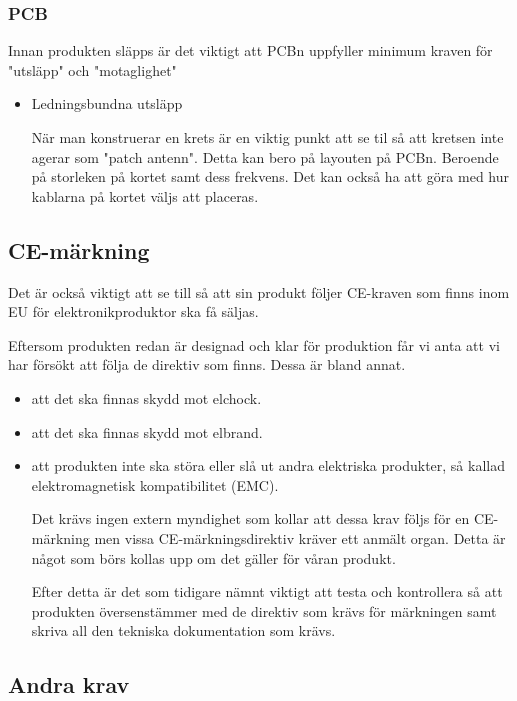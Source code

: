 \documentclass{article}
\begin{document}
\subsubsection{PCB}
Innan produkten släpps är det viktigt att PCBn uppfyller minimum kraven för "utsläpp" och "motaglighet"
\begin{itemize}
    
    \item Ledningsbundna utsläpp

        När man konstruerar en krets är en viktig punkt att se til så att kretsen inte agerar som "patch antenn". Detta kan bero på layouten på PCBn. Beroende på storleken på kortet samt dess frekvens. Det kan också ha att göra med hur kablarna på kortet väljs att placeras. \cite{Williams2011-dz}
    
\end{itemize}

\subsection{CE-märkning}
Det är också viktigt att se till så att sin produkt följer CE-kraven som finns inom EU för elektronikproduktor ska få säljas.

Eftersom produkten redan är designad och klar för produktion får vi anta att vi har försökt att följa de direktiv som finns. Dessa är bland annat.
\begin{itemize}
    \item att det ska finnas skydd mot elchock.
    \item att det ska finnas skydd mot elbrand.
    \item att produkten inte ska störa eller slå ut andra elektriska produkter, så kallad elektromagnetisk kompatibilitet (EMC). \cite{noauthor_ce-market_nodate}

    Det krävs ingen extern myndighet som kollar att dessa krav följs för en CE-märkning men vissa  CE-märkningsdirektiv kräver ett anmält organ. Detta är något som börs kollas upp om det gäller för våran produkt. \cite{pdf_elsäkerhetsverket}

    Efter detta är det som tidigare nämnt viktigt att testa och kontrollera så att produkten översenstämmer med de direktiv som krävs för märkningen samt skriva all den tekniska dokumentation som krävs.
\end{itemize}

\subsection{Andra krav}
\end{document}
